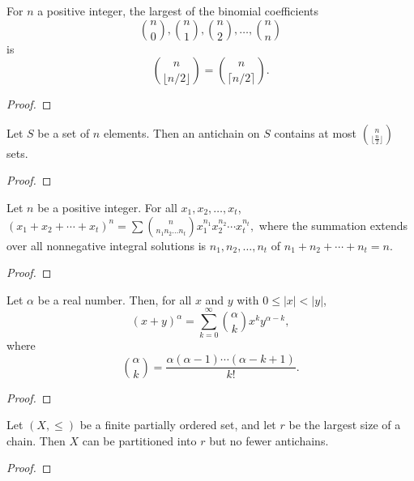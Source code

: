\begin{corollary}
    \label{cor:5.3.2}
For \( n \) a positive integer, the largest of the binomial coefficients
\[
\binom{n}{0}, \binom{n}{1}, \binom{n}{2}, \ldots, \binom{n}{n}
\]
is
\[
\binom{n}{\lfloor n/2 \rfloor} = \binom{n}{\lceil n/2 \rceil}.
\]
\end{corollary}
\begin{proof}
  \leanok
\end{proof}


\begin{theorem}
    \label{thm:5.3.3}
Let \( S \) be a set of \( n \) elements. Then an antichain on \( S \) contains at most \( \binom{n}{\lfloor \frac{n}{2} \rfloor} \) sets.
\end{theorem}
\begin{proof}
  \leanok
\end{proof}



\begin{theorem}
    \label{thm:5.4.1}
Let \( n \) be a positive integer. For all \( x_1, x_2, \ldots, x_t \),
$
(x_1 + x_2 + \cdots + x_t)^n = \sum \binom{n}{n_1n_2\ldots n_t} x_1^{n_1} x_2^{n_2} \cdots x_t^{n_t},
$
where the summation extends over all nonnegative integral solutions is \( n_1, n_2, \ldots, n_t \) of \( n_1 + n_2 + \cdots + n_t = n \).
\end{theorem}
\begin{proof} 
  \leanok
\end{proof}

\begin{theorem}
    \label{thm:5.5.1}
Let \( \alpha \) be a real number. Then, for all \( x \) and \( y \) with \( 0 \leq |x| < |y| \),
\[
(x + y)^\alpha = \sum_{k=0}^{\infty} \binom{\alpha}{k} x^k y^{\alpha-k},
\]
where
\[
\binom{\alpha}{k} = \frac{\alpha(\alpha - 1) \cdots (\alpha - k + 1)}{k!}.
\]
\end{theorem}
\begin{proof} 
  \leanok
\end{proof}

\begin{theorem}
    \label{thm:5.6.1}
Let \((X, \leq)\) be a finite partially ordered set, and let \( r \) be the largest size of a chain. Then \( X \) can be partitioned into \( r \) but no fewer antichains.
\end{theorem}
\begin{proof}  
  \leanok
\end{proof}

